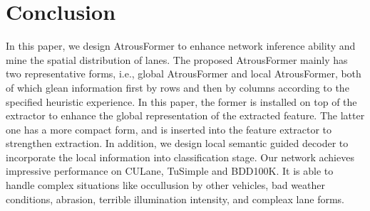 \documentclass[preprint,12pt,review]{elsarticle}
\begin{document}
\section{Conclusion}
In this paper, we design AtrousFormer to enhance network inference ability and mine the spatial distribution of lanes. The proposed AtrousFormer mainly has two representative forms, i.e., global AtrousFormer and local AtrousFormer, both of which glean information first by rows and then by columns according to the specified heuristic experience. In this paper, the former is installed on top of the extractor to enhance the global representation of the extracted feature. The latter one has a more compact form, and is inserted into the feature extractor to strengthen extraction. In addition, we design local semantic guided decoder to incorporate the local information into classification stage. Our network achieves impressive performance on CULane, TuSimple and BDD100K. It is able to handle complex situations like occullusion by other vehicles, bad weather conditions, abrasion, terrible illumination intensity, and compleax lane forms.  












\end{document}
